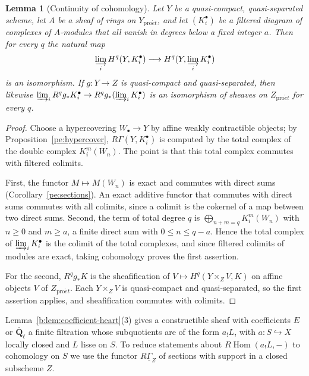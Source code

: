 \documentclass[11pt,a4paper]{article}
\numberwithin{equation}{section}
\newtheorem{lemma}[theorem]{Lemma}
\theoremstyle{definition}
\theoremstyle{remark}
\newcommand{\RHom}{R\!\operatorname{Hom}}
\newcommand{\Qbar}{\overline{\mathbf Q}_\ell}
\newcommand{\proet}{\mathrm{pro}\acute{e}t}
\begin{document}
\begin{lemma}[Continuity of cohomology]\label{b:lem:bounded-continuity}
Let $Y$ be a quasi-compact, quasi-separated scheme, let $A$ be a sheaf of
rings on $Y_{\proet}$, and let $(K_i^\bullet)$ be a filtered diagram of
complexes of $A$-modules that all vanish in degrees below a fixed integer
$a$. Then for every $q$ the natural map
\[
 \varinjlim_i H^q(Y,K_i^\bullet)
 \longrightarrow
 H^q(Y,\varinjlim_i K_i^\bullet)
\]
is an isomorphism. If $g:Y\to Z$ is quasi-compact and quasi-separated,
then likewise $\varinjlim_i R^qg_*K_i^\bullet\to R^qg_*(\varinjlim_iK_i^\bullet)$
is an isomorphism of sheaves on $Z_{\proet}$ for every $q$.
\end{lemma}
\begin{proof}
Choose a hypercovering $W_\bullet\to Y$ by affine weakly contractible
objects; by Proposition~\ref{pe:hypercover}, $R\Gamma(Y,K_i^\bullet)$ is
computed by the total complex of the double complex
$K_i^m(W_n)$. The point is that this total complex commutes with filtered
colimits.

First, the functor $M\mapsto M(W_n)$ is exact and commutes with direct
sums (Corollary~\ref{pe:sections}). An exact additive functor that
commutes with direct sums commutes with all colimits, since a colimit is
the cokernel of a map between two direct sums. Second, the term of total
degree $q$ is $\bigoplus_{n+m=q}K_i^m(W_n)$ with $n\geq0$ and $m\geq a$,
a finite direct sum with $0\leq n\leq q-a$. Hence the total complex of
$\varinjlim_iK_i^\bullet$ is the colimit of the total complexes, and
since filtered colimits of modules are exact, taking cohomology proves
the first assertion.

For the second, $R^qg_*K$ is the sheafification of
$V\mapsto H^q(Y\times_ZV,K)$ on affine objects $V$ of $Z_{\proet}$. Each
$Y\times_ZV$ is quasi-compact and quasi-separated, so the first assertion
applies, and sheafification commutes with colimits.
\end{proof}

Lemma~\ref{b:lem:coefficient-heart}(3)
gives a constructible sheaf with coefficients $E$ or $\Qbar$ a finite filtration whose subquotients are of the form $a_!L$, with
$a:S\hookrightarrow X$ locally closed and $L$ lisse on $S$. To reduce
statements about $\RHom(a_!L,-)$ to cohomology on $S$ we use the functor
$R\underline\Gamma_Z$ of sections with support in a closed subscheme $Z$.
\end{document}
